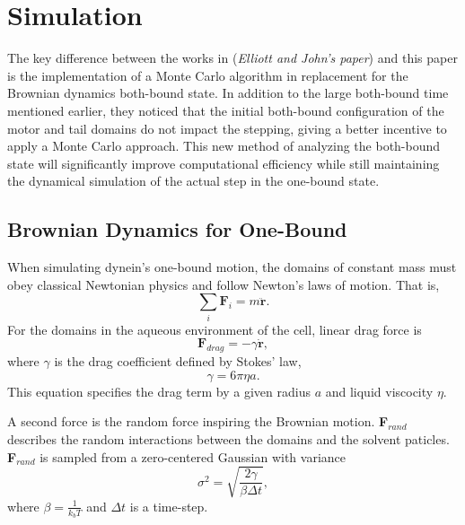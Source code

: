 \section{Simulation}

The key difference between the works in \cite{Capek2017, } (\textit{Elliott and John's paper}) and this paper is the implementation of a Monte Carlo algorithm in replacement for the Brownian dynamics both-bound state. In addition to the large both-bound time mentioned earlier, they noticed that the initial both-bound configuration of the motor and tail domains do not impact the stepping, giving a better incentive to apply a Monte Carlo approach. This new method of analyzing the both-bound state will significantly improve computational efficiency while still maintaining the dynamical simulation of the actual step in the one-bound state. 



\subsection{Brownian Dynamics for One-Bound}
\label{sec:BrownianDynamics}

When simulating dynein's one-bound motion, the domains of constant mass must obey classical Newtonian physics and follow Newton's laws of motion. That is,
\begin{equation}
	\sum_{i}\textbf{F}_i=m\ddot{\textbf{r}}.
\end{equation} 
For the domains in the aqueous environment of the cell, linear drag force is
\begin{equation}
	\textbf{F}_{drag}=-\gamma \dot{\textbf{r}},
\end{equation}
where $\gamma$ is the drag coefficient defined by Stokes' law,
\begin{equation}
	\gamma=6\pi\eta a.
\end{equation}
This equation specifies the drag term by a given radius $a$ and liquid viscocity $\eta$. 

A second force is the random force inspiring the Brownian motion. \textbf{F}$_{rand}$ describes the random interactions between the domains and the solvent paticles. \textbf{F}$_{rand}$ is sampled from a zero-centered Gaussian with variance
\begin{equation}
	\sigma^2=\sqrt{\frac{2\gamma}{\beta\Delta t}},
\end{equation}
where $\beta=\frac{1}{k_bT}$  and $\Delta t$ is a time-step. 

